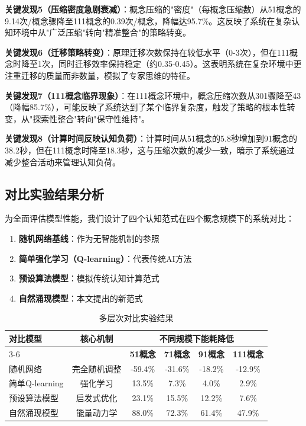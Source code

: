 \documentclass[12pt,a4paper]{article}
\begin{document}
\textbf{关键发现5（压缩密度急剧衰减）}：概念压缩的"密度"（每概念压缩数）从51概念的9.14次/概念骤降至111概念的0.39次/概念，降幅达95.7\%。这反映了系统在复杂认知环境中从"广泛压缩"转向"精准整合"的策略转变。

\textbf{关键发现6（迁移策略转变）}：原理迁移次数保持在较低水平（0-3次），但在111概念时降至1次，同时迁移效率保持稳定（约0.35-0.45）。这表明系统在复杂环境中更注重迁移的质量而非数量，模拟了专家思维的特征。

\textbf{关键发现7（111概念临界现象）}：在111概念环境中，概念压缩次数从301骤降至43（降幅85.7\%），可能反映了系统达到了某个临界复杂度，触发了策略的根本性转变，从"探索性整合"转向"保守性维持"。

\textbf{关键发现8（计算时间反映认知负荷）}：计算时间从51概念的5.8秒增加到91概念的38.2秒，但在111概念时降至18.3秒，这与压缩次数的减少一致，暗示了系统通过减少整合活动来管理认知负荷。

\subsection{对比实验结果分析}
\label{subsec:comparative_experiments}

为全面评估模型性能，我们设计了四个认知范式在四个概念规模下的系统对比：

\begin{enumerate}
\item \textbf{随机网络基线}：作为无智能机制的参照
\item \textbf{简单强化学习（Q-learning）}：代表传统AI方法
\item \textbf{预设算法模型}：模拟传统认知计算范式
\item \textbf{自然涌现模型}：本文提出的新范式
\end{enumerate}

\begin{table}[h]
\centering
\caption{多层次对比实验结果}
\label{tab:multi_level_comparison}
\begin{tabular}{lccccc}
\toprule
\textbf{对比模型} & \textbf{核心机制} & \multicolumn{4}{c}{\textbf{不同规模下能耗降低}} \\
\cmidrule(lr){3-6}
 & & \textbf{51概念} & \textbf{71概念} & \textbf{91概念} & \textbf{111概念} \\
\midrule
随机网络 & 完全随机调整 & -59.4\% & -31.6\% & -18.2\% & -12.9\% \\
简单Q-learning & 强化学习 & 13.5\% & 7.3\% & 4.0\% & 2.9\% \\
预设算法模型 & 启发式优化 & 23.1\% & 15.5\% & 12.2\% & 7.6\% \\
自然涌现模型 & 能量动力学 & 88.0\% & 72.3\% & 61.4\% & 47.9\% \\
\bottomrule
\end{tabular}
\end{table}
\end{document}
